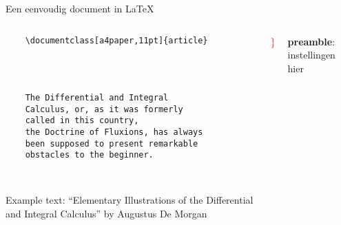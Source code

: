 \begin{frame}[fragile, t]{Een eenvoudig document in \LaTeX}
	\begin{columns}[t]
        \begin{column}{0.6\textwidth}
			\vspace{-20pt}
	\begin{verbatim} 
	\documentclass[a4paper,11pt]{article}

		
	

	The Differential and Integral 
	Calculus, or, as it was formerly 
	called in this country, 
	the Doctrine of Fluxions, has always 
	been supposed to present remarkable 
	obstacles to the beginner.

	
	\end{verbatim}

	{\tiny
	Example text: ``Elementary Illustrations of the Differential and Integral Calculus''
	by Augustus De Morgan
	\par}
\end{column}
\begin{column}{0.05\textwidth}
	\vspace{0pt}

	{\Huge \textcolor{red}{ \} } }
	\\[1.5cm]
	\phantom{{\Huge \textcolor{red}{ \} } }}
	
\end{column}
\begin{column}{0.3\textwidth}
	\vspace{0pt}
	
	\textbf{preamble}: instellingen hier
	\\[1.5cm]
\end{column}
\end{columns}

\end{frame}
